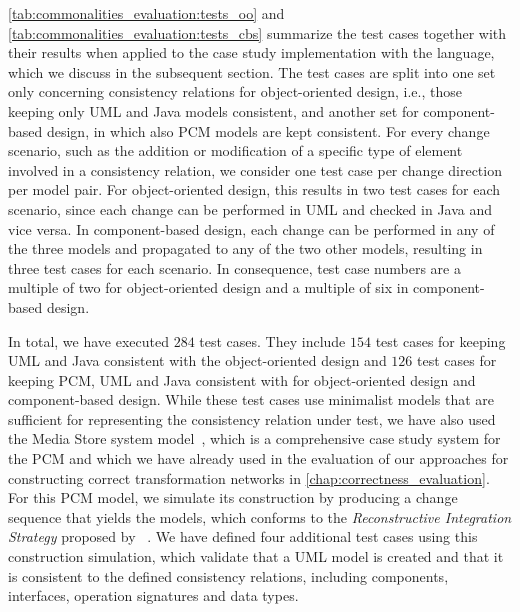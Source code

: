 \autoref{tab:commonalities_evaluation:tests_oo} and \autoref{tab:commonalities_evaluation:tests_cbs} summarize the test cases together with their results when applied to the case study implementation with the \commonalities language, which we discuss in the subsequent section.
The test cases are split into one set only concerning consistency relations for object-oriented design, i.e., those keeping only \gls{UML} and Java models consistent, and another set for component-based design, in which also \gls{PCM} models are kept consistent.
For every change scenario, such as the addition or modification of a specific type of element involved in a consistency relation, we consider one test case per change direction per model pair.
For object-oriented design, this results in two test cases for each scenario, since each change can be performed in \gls{UML} and checked in Java and vice versa.
In component-based design, each change can be performed in any of the three models and propagated to any of the two other models, resulting in three test cases for each scenario.
In consequence, test case numbers are a multiple of two for object-oriented design and a multiple of six in component-based design.

In total, we have executed $284$ test cases.
They include $154$ test cases for keeping \gls{UML} and Java consistent with the object-oriented design \commonalities and $126$ test cases for keeping \gls{PCM}, \gls{UML} and Java consistent with \commonalities for object-oriented design and component-based design.
While these test cases use minimalist models that are sufficient for representing the consistency relation under test, we have also used the Media Store system model~\cite{strittmatter2016a}, which is a comprehensive case study system for the \gls{PCM} and which we have already used in the evaluation of our approaches for constructing correct transformation networks in \autoref{chap:correctness_evaluation}.
For this \gls{PCM} model, we simulate its construction by producing a change sequence that yields the models, which conforms to the \emph{Reconstructive Integration Strategy} proposed by \citeauthor{langhammer2017a}~.
We have defined four additional test cases using this construction simulation, which validate that a \gls{UML} model is created and that it is consistent to the defined consistency relations, including components, interfaces, operation signatures and data types.

